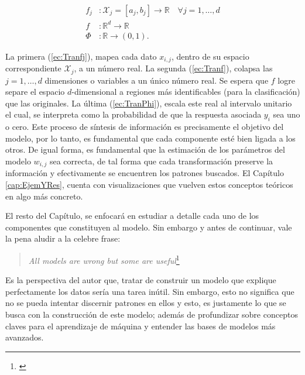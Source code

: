 \documentclass[../Main/Main.tex]{subfiles}
\begin{document}
\begin{align}
	f_j&:\mathcal{X}_j=[a_j,b_j]\rightarrow \mathbb{R} \quad \forall j = 1,\ldots,d \label{ec:Tranfj}\\
	f&:\mathbb{R}^d \rightarrow \mathbb{R} \label{ec:Tranf} \\
	\Phi&:\mathbb{R} \rightarrow (0,1 \label{ec:TranPhi}).
\end{align}

La primera (\ref{ec:Tranfj}), mapea cada dato $x_{i,j}$, dentro de su espacio correspondiente $\mathcal{X}_j$, a un número real. La segunda (\ref{ec:Tranf}), colapsa las $j=1,\ldots,d$ dimensiones o variables a un único número real. Se espera que $f$ logre separe el espacio $d$-dimensional a regiones más identificables (para la clasificación) que las originales. La última (\ref{ec:TranPhi}), escala este real al intervalo unitario el cual, se interpreta como la probabilidad de que la respuesta asociada $y_{i}$ sea uno o cero. Este proceso de síntesis de información es precisamente el objetivo del modelo, por lo tanto, es fundamental que cada componente esté bien ligada a los otros. De igual forma, es fundamental que la estimación de los parámetros del modelo $w_{i,j}$ sea correcta, de tal forma que cada transformación preserve la información y efectivamente se encuentren los patrones buscados. El Capítulo \ref{cap:EjemYRes}, cuenta con visualizaciones que vuelven estos conceptos teóricos en algo más concreto. 

El resto del Capítulo, se enfocará en estudiar a detalle cada uno de los componentes que constituyen al modelo. Sin embargo y antes de continuar, vale la pena aludir a la celebre frase:
\begin{quote}
\textit{All models are wrong but some are useful}\footnote{\citet{box1979robustnessinthe}}
\end{quote}

Es la perspectiva del autor que, tratar de construir un modelo que explique perfectamente los datos sería una tarea inútil. Sin embargo, esto no significa que no se pueda intentar discernir patrones en ellos y esto, es justamente lo que se busca con la construcción de este modelo; además de profundizar sobre conceptos claves para el aprendizaje de máquina y entender las bases de modelos más avanzados.
\end{document}
